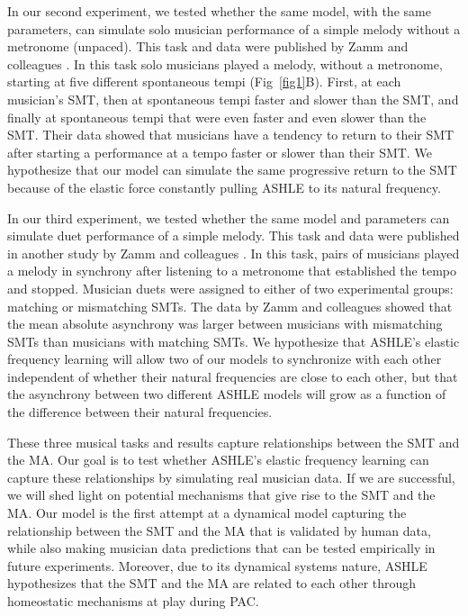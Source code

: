 \documentclass[10pt,letterpaper]{article}
\begin{document}
In our second experiment, we tested whether the same model, with the same parameters, can simulate solo musician performance of a simple melody without a metronome (unpaced). This task and data were published by Zamm and colleagues \cite{zamm2018musicians}. In this task solo musicians played a melody, without a metronome, starting at five different spontaneous tempi (Fig~\ref{fig1}B). First, at each musician's SMT, then at spontaneous tempi faster and slower than the SMT, and finally at spontaneous tempi that were even faster and even slower than the SMT. Their data showed that musicians have a tendency to return to their SMT after starting a performance at a tempo faster or slower than their SMT. We hypothesize that our model can simulate the same progressive return to the SMT because of the elastic force constantly pulling ASHLE to its natural frequency.

In our third experiment, we tested whether the same model and parameters can simulate duet performance of a simple melody. This task and data were published in another study by Zamm and colleagues \cite{zamm2016endogenous}. In this task, pairs of musicians played a melody in synchrony after listening to a metronome that established the tempo and stopped. Musician duets were assigned to either of two experimental groups: matching or mismatching SMTs. The data by Zamm and colleagues \cite{zamm2016endogenous} showed that the mean absolute asynchrony was larger between musicians with mismatching SMTs than musicians with matching SMTs. We hypothesize that ASHLE's elastic frequency learning will allow two of our models to synchronize with each other independent of whether their natural frequencies are close to each other, but that the asynchrony between two different ASHLE models will grow as a function of the difference between their natural frequencies.

These three musical tasks and results capture relationships between the SMT and the MA. Our goal is to test whether ASHLE's elastic frequency learning can capture these relationships by simulating real musician data. If we are successful, we will shed light on potential mechanisms that give rise to the SMT and the MA. Our model is the first attempt at a dynamical model capturing the relationship between the SMT and the MA that is validated by human data, while also making musician data predictions that can be tested empirically in future experiments. Moreover, due to its dynamical systems nature, ASHLE hypothesizes that the SMT and the MA are related to each other through homeostatic mechanisms at play during PAC.
\end{document}
